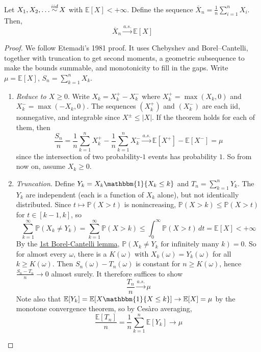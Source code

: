 	\begin{theorem}
    \label{thm:strong-law-of-large-numbers}
		Let $X_1, X_2, \ldots \iidsim X$ with $\mathbb{E}[X] < +\infty$. Define the sequence $\overline{X}_n = \frac{1}{n} \sum_{i = 1}^n X_i$. Then, 
		\begin{equation}
			\overline{X}_n \xrightarrow{a.s.} \mathbb{E}[X] 
		\end{equation}
	\end{theorem}
	\begin{proof}
		 We follow Etemadi's 1981 proof. It uses Chebyshev and Borel--Cantelli, together with truncation to get second moments, a geometric subsequence to make the bounds summable, and monotonicity to fill in the gaps. Write $\mu = \mathbb{E}[X]$, $S_n = \sum_{k=1}^n X_k$.
		 \begin{enumerate}
			 \item \textit{Reduce to $X \geq 0$}. Write $X_k = X_k^+ - X_k^-$ where $X_k^+ = \max(X_k, 0)$ and $X_k^- = \max(-X_k, 0)$. The sequences $(X_k^+)$ and $(X_k^-)$ are each iid, nonnegative, and integrable since $X^\pm \leq |X|$. If the theorem holds for each of them, then
			 \begin{equation}
				 \frac{S_n}{n} = \frac{1}{n}\sum_{k=1}^n X_k^+ - \frac{1}{n}\sum_{k=1}^n X_k^- \xrightarrow{a.s.} \mathbb{E}[X^+] - \mathbb{E}[X^-] = \mu
			 \end{equation}
			 since the intersection of two probability-$1$ events has probability $1$. So from now on, assume $X_k \geq 0$.

			 \item \textit{Truncation}. Define $Y_k = X_k \mathbbm{1}\{X_k \leq k\}$ and $T_n = \sum_{k=1}^n Y_k$. The $Y_k$ are independent (each is a function of $X_k$ alone), but not identically distributed. Since $t \mapsto \mathbb{P}(X > t)$ is nonincreasing, $\mathbb{P}(X > k) \leq \mathbb{P}(X > t)$ for $t \in [k-1, k]$, so
			 \begin{equation}
				 \sum_{k=1}^\infty \mathbb{P}(X_k \neq Y_k) = \sum_{k=1}^\infty \mathbb{P}(X > k) \leq \int_0^\infty \mathbb{P}(X > t) \, dt = \mathbb{E}[X] < +\infty
			 \end{equation}
			 By the \hyperref[thm:1st-borel-cantelli-lemma]{1st Borel-Cantelli lemma}, $\mathbb{P}(X_k \neq Y_k \text{ for infinitely many } k) = 0$. So for almost every $\omega$, there is a $K(\omega)$ with $X_k(\omega) = Y_k(\omega)$ for all $k \geq K(\omega)$. Then $S_n(\omega) - T_n(\omega)$ is constant for $n \geq K(\omega)$, hence $\frac{S_n - T_n}{n} \to 0$ almost surely. It therefore suffices to show
			 \begin{equation}
				 \frac{T_n}{n} \xrightarrow{a.s.} \mu
			 \end{equation}
			 Note also that $\mathbb{E}[Y_k] = \mathbb{E}[X \mathbbm{1}\{X \leq k\}] \to \mathbb{E}[X] = \mu$ by the monotone convergence theorem, so by Ces\`aro averaging,
			 \begin{equation}
				 \frac{\mathbb{E}[T_n]}{n} = \frac{1}{n}\sum_{k=1}^n \mathbb{E}[Y_k] \to \mu
			 \end{equation}


\end{enumerate}
\end{proof}
